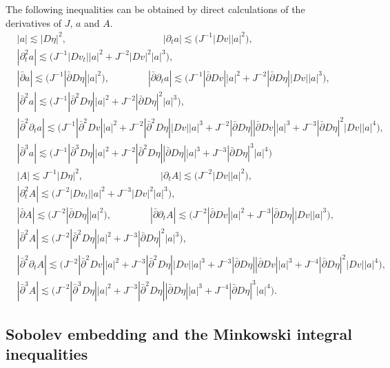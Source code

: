 \documentclass[12pt,a4paper]{amsart}
\numberwithin{equation}{section}
\theoremstyle{plain}
\theoremstyle{definition}
\newcommand{\bpartial}{\bar{\partial}}
\begin{document}
The following inequalities can be obtained by direct calculations of the derivatives of $J$, $a$ and $A$.
\begin{align*}
& |a|\lesssim |D\eta|^2,\qquad\qquad\qquad\qquad\qquad|\partial_t a |\lesssim  \Big(J^{-1}|Dv| |a|^2\Big), \\
& |\partial_t^2 a |\lesssim \Big(J^{-1}|Dv_t| |a|^2+J^{-2}|Dv|^2|a|^3\Big),\\
& |\bpartial a |\lesssim  \Big(J^{-1}|\bpartial  D \eta| |a|^2\Big),\qquad\qquad |\bpartial\partial_t a |\lesssim  \Big(J^{-1}|\bpartial  D v| |a|^2+J^{-2}|\bpartial D\eta| |Dv| |a|^3\Big),\\
& |\bpartial^2 a |\lesssim  \Big(J^{-1}|\bpartial^2  D \eta| |a|^2 + J^{-2}|\bpartial  D \eta|^2|a|^3\Big),\\
& |\bpartial^2 \partial_t a|\lesssim  \Big(J^{-1}|\bpartial^2   D v| |a|^2 +J^{-2}|\bpartial^2   D \eta| |Dv| |a|^3 + J^{-2}|\bpartial  D \eta| |\bpartial  D v| |a|^3+J^{-3}|\bpartial  D \eta|^2 |Dv| |a|^4\Big),\\
&|\bpartial^3 a|\lesssim  \Big(J^{-1}|\bpartial^3   D \eta| |a|^2 +J^{-2}|\bpartial^2   D \eta| |\bpartial D \eta| |a|^3 +J^{-3}|\bpartial  D \eta|^3 |a|^4 \Big)\\
& |A|\lesssim J^{-1}|D\eta|^2,\qquad\qquad\qquad\qquad |\partial_t A |\lesssim  \Big(J^{-2}|Dv| |a|^2\Big),\\
& |\partial_t^2 A |\lesssim  \Big(J^{-2}|Dv_t| |a|^2+J^{-3}|Dv|^2|a|^3\Big),\\
& |\bpartial A |\lesssim  \Big(J^{-2}|\bpartial  D \eta| |a|^2\Big),\qquad\qquad |\bpartial\partial_t A |\lesssim  \Big(J^{-2}|\bpartial  D v| |a|^2+J^{-3}|\bpartial D\eta| |Dv| |a|^3\Big),\\
& |\bpartial^2 A |\lesssim  \Big(J^{-2}|\bpartial^2  D \eta| |a|^2 + J^{-3}|\bpartial  D \eta|^2|a|^3\Big),\\
& |\bpartial^2 \partial_t A|\lesssim  \Big(J^{-2}|\bpartial^2   D v| |a|^2 +J^{-3}|\bpartial^2   D \eta| |Dv| |a|^3 + J^{-3}|\bpartial  D \eta| |\bpartial  D v|  |a|^3+J^{-4}|\bpartial  D \eta|^2 |Dv| |a|^4\Big),\\
& |\bpartial^3  A|\lesssim  \Big(J^{-2}|\bpartial^3   D \eta| |a|^2 +J^{-3}|\bpartial^2   D \eta| |\bpartial D\eta| |a|^3  +J^{-4}|\bpartial  D \eta|^3 |a|^4\Big).
\end{align*}



\vspace{0.3cm}
\subsection{Sobolev embedding and the Minkowski integral inequalities}~
\end{document}
